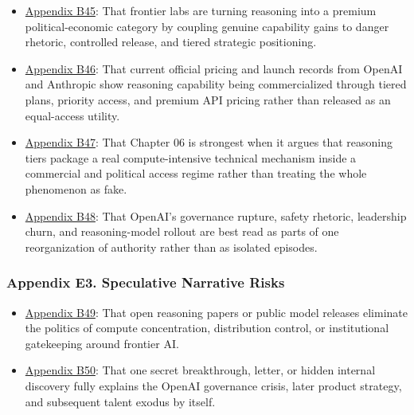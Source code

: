 \documentclass[
  american,
  11pt,
  letterpaper,
]{article}
\providecommand{\tightlist}{%
  \setlength{\itemsep}{0pt}\setlength{\parskip}{0pt}}
\begin{document}
\begin{itemize}
\tightlist
\item
  \hyperref[ch-06-appendix-b45-frontier-labs-are-turning-reasoning-into-a-premium-political-economic-category-by]{Appendix
  B45}: That frontier labs are turning reasoning into a premium
  political-economic category by coupling genuine capability gains to
  danger rhetoric, controlled release, and tiered strategic positioning.
\item
  \hyperref[ch-06-appendix-b46-current-official-pricing-and-launch-records-from-openai-and-anthropic-show-reason]{Appendix
  B46}: That current official pricing and launch records from OpenAI and
  Anthropic show reasoning capability being commercialized through
  tiered plans, priority access, and premium API pricing rather than
  released as an equal-access utility.
\item
  \hyperref[ch-06-appendix-b47-chapter-06-is-strongest-when-it-argues-that-reasoning-tiers-package-a-real-comput]{Appendix
  B47}: That Chapter 06 is strongest when it argues that reasoning tiers
  package a real compute-intensive technical mechanism inside a
  commercial and political access regime rather than treating the whole
  phenomenon as fake.
\item
  \hyperref[ch-06-appendix-b48-openai-s-governance-rupture-safety-rhetoric-leadership-churn-and-reasoning-mod]{Appendix
  B48}: That OpenAI's governance rupture, safety rhetoric, leadership
  churn, and reasoning-model rollout are best read as parts of one
  reorganization of authority rather than as isolated episodes.
\end{itemize}

\subsubsection{Appendix E3. Speculative Narrative
Risks}\label{ch-06-appendix-e3-speculative-narrative-risks}

\begin{itemize}
\tightlist
\item
  \hyperref[ch-06-appendix-b49-open-reasoning-papers-or-public-model-releases-eliminate-the-politics-of-compute]{Appendix
  B49}: That open reasoning papers or public model releases eliminate
  the politics of compute concentration, distribution control, or
  institutional gatekeeping around frontier AI.
\item
  \hyperref[ch-06-appendix-b50-one-secret-breakthrough-letter-or-hidden-internal-discovery-fully-explains-the]{Appendix
  B50}: That one secret breakthrough, letter, or hidden internal
  discovery fully explains the OpenAI governance crisis, later product
  strategy, and subsequent talent exodus by itself.
\end{itemize}
\end{document}
